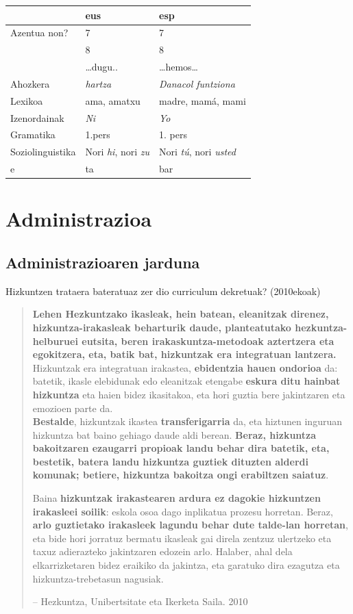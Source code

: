 \documentclass[
]{book}
\begin{document}
\begin{longtable}[]{@{}lll@{}}
\toprule
& eus & esp \\
\midrule
\endhead
Azentua non? & 7 & 7 \\
& 8 & 8 \\
& \ldots dugu.. & \ldots hemos\ldots{} \\
Ahozkera & \emph{hartza} & \emph{Danacol funtziona} \\
Lexikoa & ama, amatxu & madre, mamá, mami \\
Izenordainak & \emph{Ni} & \emph{Yo} \\
Gramatika & 1.pers & 1. pers \\
Soziolinguistika & Nori \emph{hi}, nori \emph{zu} & Nori \emph{tú}, nori \emph{usted} \\
e & ta & bar \\
\bottomrule
\end{longtable}

\hypertarget{administrazioa}{%
\section{Administrazioa}\label{administrazioa}}

\hypertarget{administrazioaren-jarduna}{%
\subsection{Administrazioaren jarduna}\label{administrazioaren-jarduna}}

Hizkuntzen trataera bateratuaz zer dio curriculum dekretuak? (2010ekoak)

\begin{quote}
\textbf{Lehen Hezkuntzako ikasleak, hein batean, eleanitzak direnez, hizkuntza-irakasleak beharturik daude, planteatutako hezkuntza-helburuei eutsita, beren irakaskuntza-metodoak aztertzera eta egokitzera, eta, batik bat, hizkuntzak era integratuan lantzera.} Hizkuntzak era integratuan irakastea, \textbf{ebidentzia hauen ondorioa} da: batetik, ikasle elebidunak edo eleanitzak etengabe \textbf{eskura ditu hainbat hizkuntza} eta haien bidez ikasitakoa, eta hori guztia bere jakintzaren eta emozioen parte da.\\
\textbf{Bestalde}, hizkuntzak ikastea \textbf{transferigarria} da, eta hiztunen inguruan hizkuntza bat baino gehiago daude aldi berean. \textbf{Beraz, hizkuntza bakoitzaren ezaugarri propioak landu behar dira batetik, eta, bestetik, batera landu hizkuntza guztiek dituzten alderdi komunak; betiere, hizkuntza bakoitza ongi erabiltzen saiatuz}.

Baina \textbf{hizkuntzak irakastearen ardura ez dagokie hizkuntzen irakasleei soilik}: eskola osoa dago inplikatua prozesu horretan. Beraz, \textbf{arlo guztietako irakasleek lagundu behar dute talde-lan horretan}, eta bide hori jorratuz bermatu ikasleak gai direla zentzuz ulertzeko eta taxuz adierazteko jakintzaren edozein arlo. Halaber, ahal dela elkarrizketaren bidez eraikiko da jakintza, eta garatuko dira ezagutza eta hizkuntza-trebetasun nagusiak.

-- Hezkuntza, Unibertsitate eta Ikerketa Saila. 2010
\end{quote}
\end{document}
